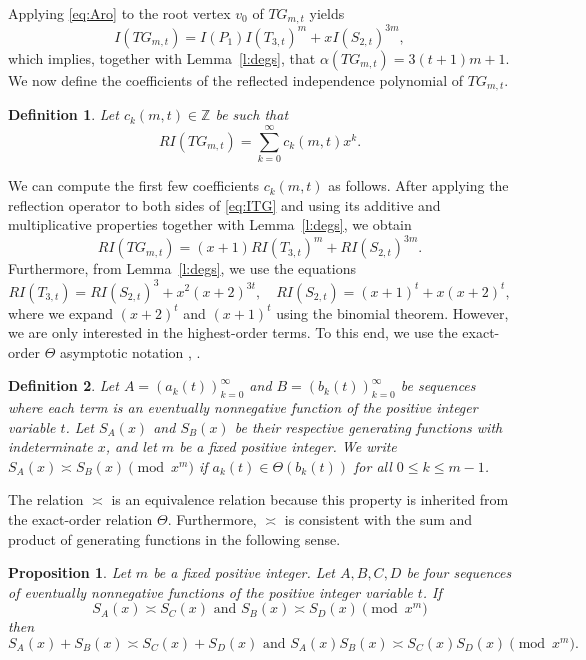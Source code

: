 \documentclass[reqno]{amsart}
\newtheorem{definition}{Definition}
\newtheorem{prop}{Proposition}
\begin{document}
Applying \eqref{eq:Aro} to the root vertex $v_0$ of $TG_{m,t}$ yields
\begin{equation}\label{eq:ITG}
I(TG_{m,t}) = I(P_1) I(T_{3,t})^m + x I(S_{2,t})^{3m},
\end{equation}
which implies, together with Lemma~\ref{l:degs}, that $\alpha(TG_{m,t}) = 3(t+1)m + 1$. We now define the coefficients of the reflected independence polynomial of $TG_{m,t}$.


\begin{definition}
Let $c_k(m,t) \in \mathbb{Z}$ be such that 
\[
R I(TG_{m,t}) = \sum_{k=0}^{\infty} c_k(m,t) x^k.
\]
\end{definition}

We can compute the first few coefficients $c_k(m,t)$ as follows.
After applying the reflection operator to both sides of \eqref{eq:ITG} and using its additive and multiplicative properties together with Lemma~\ref{l:degs}, we obtain
\begin{equation}\label{eq:main}
R I(TG_{m,t}) = (x+1) R I(T_{3,t})^m + R I(S_{2,t})^{3m}.
\end{equation} 
 Furthermore, from Lemma~\ref{l:degs}, we use the equations
\begin{equation}\label{eq:RTRS}
R I(T_{3,t}) =R I(S_{2,t})^3 + x^{2} (x+2)^{3t},\quad
R I(S_{2,t}) = (x+1)^t + x(x+2)^t,
\end{equation}
where we expand $(x+2)^{t}$ and $(x+1)^t$ using the binomial theorem. However, we are only interested in the highest-order terms. To this end, we use the exact-order $\Theta$ asymptotic notation \cite[p. 87]{Brassard}, \cite[p. 110]{Knuth}.

\begin{definition}
Let $A= (a_k(t))_{k=0}^{\infty}$ and $B= (b_k(t))_{k=0}^\infty$ be sequences where each term is an eventually nonnegative function of the positive integer variable $t$. Let $S_A(x)$ and $S_B(x)$ be their respective generating functions with indeterminate $x$, and let $m$ be a fixed positive integer. We write $S_A(x) \asymp S_B(x) \pmod{x^m}$ if $a_k(t) \in \Theta(b_k(t))$ for all $0 \leq k \leq m-1$.
\end{definition}


The relation $\asymp$ is an equivalence relation because this property is inherited from the exact-order relation $\Theta$. Furthermore, $\asymp$ is consistent with the sum and product of generating functions in the following sense.

\begin{prop}\label{prop:0}
Let $m$ be a fixed positive integer. Let $A,B,C,D$ be four sequences of eventually nonnegative functions of the positive integer variable $t$. If 
\[S_A(x)\asymp S_C(x)\text{ and }S_B(x)\asymp S_D(x)\pmod{x^m}\]
then
\[
S_A(x)+S_B(x)\asymp S_C(x)+S_D(x)\text{ and }S_A(x)S_B(x)\asymp S_C(x)S_D(x)\pmod{x^m}.
\]
\end{prop}
\end{document}
